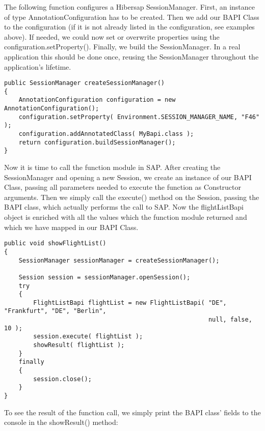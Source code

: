 The following function configures a Hibersap SessionManager.
First, an instance of type AnnotationConfiguration has to be created.
Then we add our BAPI Class to the configuration (if it is not already listed in the configuration, see examples above).
If needed, we could now set or overwrite properties using the configuration.setProperty().
Finally, we build the SessionManager.
In a real application this should be done once, reusing the SessionManager throughout the
application's lifetime.

\begin{Verbatim}[frame=single,label=Creating the SessionManager]
public SessionManager createSessionManager()
{
    AnnotationConfiguration configuration = new AnnotationConfiguration();
    configuration.setProperty( Environment.SESSION_MANAGER_NAME, "F46" );
    configuration.addAnnotatedClass( MyBapi.class );
    return configuration.buildSessionManager();
}
\end{Verbatim}

Now it is time to call the function module in SAP.
After creating the SessionManager and opening a new Session, we create an instance of our
BAPI Class, passing all parameters needed to execute the function as Constructor arguments.
Then we simply call the execute() method on the Session, passing the BAPI class,
which actually performs the call to SAP. Now the flightListBapi object is enriched with all the
values which the function module returned and which we have mapped in our BAPI Class.

\begin{Verbatim}[frame=single,label=Executing the function]
public void showFlightList()
{
    SessionManager sessionManager = createSessionManager();

    Session session = sessionManager.openSession();
    try
    {
        FlightListBapi flightList = new FlightListBapi( "DE", "Frankfurt", "DE", "Berlin", 
                                                        null, false, 10 );
        session.execute( flightList );
        showResult( flightList );
    }
    finally
    {
        session.close();
    }
}
\end{Verbatim}

To see the result of the function call, we simply print the BAPI class' fields to the console in the
showResult() method:


